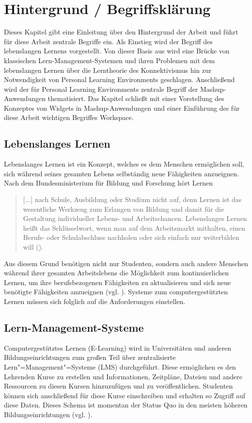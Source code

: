 \chapter{Hintergrund / Begriffsklärung}\label{chapter:Kapitel2}

Dieses Kapitel gibt eine Einleitung über den Hintergrund der Arbeit und führt für diese Arbeit zentrale Begriffe ein. Als Einstieg wird der Begriff des lebenslangen Lernens vorgestellt. Von dieser Basis aus wird eine Brücke von klassischen Lern-Management-Systemen und ihren Problemen mit dem lebenslangen Lernen über die Lerntheorie des Konnektivismus hin zur Notwendigkeit von Personal Learning Environments geschlagen. Anschließend wird der für Personal Learning Environments zentrale Begriff der Mashup-Anwendungen thematisiert. Das Kapitel schließt mit einer Vorstellung des Konzeptes von Widgets in Mashup-Anwendungen und einer Einführung des für diese Arbeit wichtigen Begriffes Workspace. 

\section{Lebenslanges Lernen}
Lebenslanges Lernen ist ein Konzept, welches es dem Menschen ermöglichen soll, sich während seines gesamten Lebens selbständig neue Fähigkeiten anzueignen. Nach dem Bundesministerium für Bildung und Forschung hört Lernen \begin{quotation}
 [...] nach Schule, Ausbildung oder Studium nicht auf, denn Lernen ist das wesentliche Werkzeug zum Erlangen von Bildung und damit für die Gestaltung individueller Lebens- und Arbeitschancen. Lebenslanges Lernen heißt das Schlüsselwort, wenn man auf dem Arbeitsmarkt mithalten, einen Berufs- oder Schulabschluss nachholen oder sich einfach nur weiterbilden will (\cite{BMBF2008}).
\end{quotation}
Aus diesem Grund benötigen nicht nur Studenten, sondern auch andere Menschen während ihrer gesamten Arbeitslebens die Möglichkeit zum kontinuierlichen Lernen, um ihre berufsbezogenen Fähigkeiten zu aktualisieren und sich neue benötigte Fähigkeiten anzueignen (vgl. \cite{Attwell2007}). Systeme zum computergestützten Lernen müssen sich folglich auf die Anforderungen einstellen.

\section{Lern-Management-Systeme}\label{section:lms}
Computergestütztes Lernen (E-Learning) wird in Universitäten und anderen Bildungseinrichtungen zum großen Teil über zentralisierte Lern"=Management"=Systeme (LMS) durchgeführt. Diese ermöglichen es den Lehrenden Kurse zu erstellen und Informationen, Zeitpläne, Dateien und andere Ressourcen zu diesen Kursen hinzuzufügen und zu veröffentlichen. Studenten können sich anschließend für diese Kurse einschreiben und erhalten so Zugriff auf diese Daten. Dieses Schema ist momentan der Status Quo in den meisten höheren Bildungseinrichtungen (vgl. \cite{Mott2010}). 

